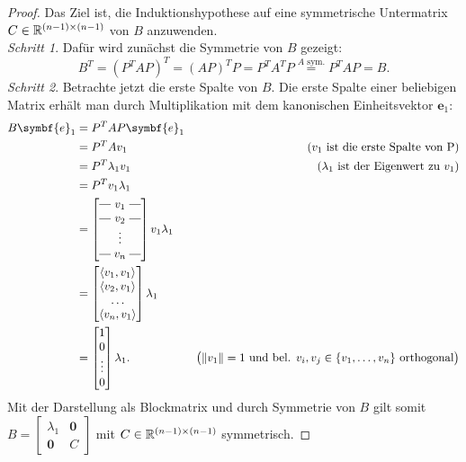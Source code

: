 \begin{proof}
    Das Ziel ist, die Induktionshypothese auf eine symmetrische Untermatrix \(C \in \mathbb{R}^{\left(n-1\right)\times\left(n-1\right)}\) von \(B\) anzuwenden.\\
    \textit{Schritt 1}.
    Dafür wird zunächst die Symmetrie von \(B\) gezeigt:   
    \begin{equation*}
        B^{T} = {\left(P^{T}AP\right)}^{T} = {\left(AP\right)}^{T}P = P^{T}A^{T}P \overset{A\text{ sym.}}{=} P^{T}AP = B.
    \end{equation*} 
    \textit{Schritt 2}.
    Betrachte jetzt die erste Spalte von \(B\). 
    Die erste Spalte einer beliebigen Matrix erhält man durch Multiplikation mit dem kanonischen Einheitsvektor \(\symbf{e}_1\): 
    \begin{align*}
        B\symbf{e}_1 &= P^{T}AP\symbf{e}_1 \\
        &= P^{T}Av_1 & \left(v_1 \text{ ist die erste Spalte von P}\right) \\
        &= P^{T}{\lambda}_1v_1 & \left({\lambda}_1\text{ ist der Eigenwert zu } v_1\right) \\
        &= P^{T}v_1{\lambda}_1 \\
        &= \brows{v_1 \\ v_2 \\ \rowsvdots \\ v_n}v_1{\lambda}_1 \\
        &= 
        \begin{bmatrix}
                \langle v_1,v_1 \rangle \\ \langle v_2,v_1 \rangle \\ \dots \\ \langle v_n,v_1 \rangle
        \end{bmatrix}
        {\lambda}_1 \\
        &=
        \begin{bmatrix}
            1  \\ 0 \\ \vdots \\ 0
        \end{bmatrix}
        {\lambda}_1. & \bigl(\norm{v_1} = 1 \text{ und bel. } v_i,v_j \in \{v_1,\ldots,v_n\} \text{ orthogonal}\bigr)
    \end{align*}
    Mit der Darstellung als Blockmatrix und durch Symmetrie von \(B\) gilt somit 
    \(
    B = 
    \begin{bmatrix}
        {\lambda}_1 & \symbf{0} \\
        \symbf{0} & C
    \end{bmatrix}
    \)
    mit \(C \in \mathbb{R}^{(n-1) \times (n-1)}\) symmetrisch.


\end{proof}
